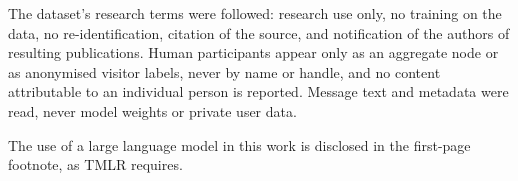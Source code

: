 \documentclass[10pt]{article}
\begin{document}
The dataset's research terms were followed: research use only, no training on the data, no
re-identification, citation of the source, and notification of the authors of resulting publications.
Human participants appear only as an aggregate node or as anonymised visitor labels, never by name or
handle, and no content attributable to an individual person is reported. Message text and metadata
were read, never model weights or private user data.

The use of a large language model in this work is disclosed in the first-page footnote, as TMLR
requires.
\end{document}
